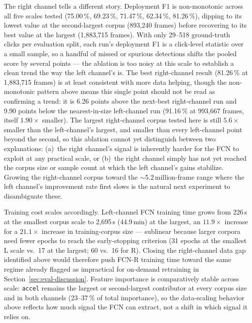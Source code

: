 The right channel tells a different story. Deployment F1 is non-monotonic
across all five scales tested (75.00\,\%, 69.23\,\%, 71.47\,\%, 62.34\,\%,
81.26\,\%), dipping to its lowest value at the second-largest corpus
(893,240 frames) before recovering to its best value at the largest
(1,883,715 frames). With only 29--518 ground-truth clicks per evaluation split,
each run's deployment F1 is a click-level statistic over a small sample, so
a handful of missed or spurious detections shifts the pooled score by several
points --- the ablation is too noisy at this scale to establish a clean
trend the way the left channel's is. The best right-channel result (81.26\,\%
at 1,883,715 frames) is at least consistent with more data helping, though the
non-monotonic pattern above means this single point should not be read as
confirming a trend: it is 6.26 points above the next-best right-channel run
and 9.90 points below the nearest-in-size left-channel run
(91.16\,\% at 993,667 frames, itself $1.90\times$ smaller). The largest
right-channel corpus tested here is still $5.6\times$ smaller than the
left-channel's largest, and smaller than every left-channel point beyond the
second, so this ablation cannot yet distinguish between two explanations:
(a)~the right channel's signal is inherently harder for the FCN to exploit at
any practical scale, or (b)~the right channel simply has not yet reached the
corpus size or sample count at which the left channel's gains stabilize.
Growing the right-channel corpus toward the $\sim$5.2\,million-frame range where
the left channel's improvement rate first slows is the natural next
experiment to disambiguate these.

Training cost scales accordingly. Left-channel FCN training time grows from 226\,s at
the smallest corpus scale to 2,695\,s (44.9\,min) at the largest, an $11.9\times$
increase for a $21.1\times$ increase in training-corpus size --- sublinear because
larger corpora need fewer epochs to reach the early-stopping criterion (31 epochs at
the smallest L scale vs.\ 17 at the largest; 60 vs.\ 16 for R). Closing the
right-channel data gap identified above would therefore push FCN-R training time
toward the same regime already flagged as impractical for on-demand retraining in
Section~\ref{sec:eval-discussion}. Feature importance is comparatively stable across
scale: \texttt{accel} remains the largest or second-largest contributor at every
corpus size and in both channels (23--37\,\% of total importance), so the data-scaling
behavior above reflects how much signal the FCN can extract, not a shift in which
signal it relies on.

